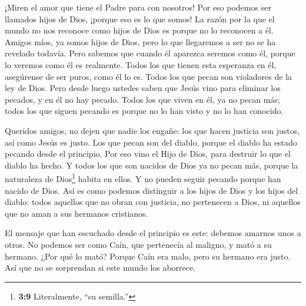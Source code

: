  ¡Miren el amor que tiene el Padre para con nosotros! Por
eso podemos ser llamados hijos de Dios, ¡porque eso es lo que somos! La
razón por la que el mundo no nos reconoce como hijos de Dios es porque
no lo reconocen a él.  Amigos míos, ya somos hijos de Dios,
pero lo que llegaremos a ser no se ha revelado todavía. Pero sabemos que
cuando él aparezca seremos como él, porque lo veremos como él es
realmente.  Todos los que tienen esta esperanza en él,
asegúrense de ser puros, como él lo es.  Todos los que pecan
son violadores de la ley de Dios.  Pero desde luego ustedes
saben que Jesús vino para eliminar los pecados, y en él no hay pecado.
 Todos los que viven en él, ya no pecan más; todos los que
siguen pecando es porque no lo han visto y no lo han conocido.

 Queridos amigos, no dejen que nadie los engañe: los que
hacen justicia son justos, así como Jesús es justo.  Los que
pecan son del diablo, porque el diablo ha estado pecando desde el
principio. Por eso vino el Hijo de Dios, para destruir lo que el diablo
ha hecho.  Y todos los que son nacidos de Dios ya no pecan
más, porque la naturaleza de Dios\footnote{\textbf{3:9} Literalmente,
  ``su semilla.''} habita en ellos. Y no pueden seguir pecando porque
han nacido de Dios.  Así es como podemos distinguir a los
hijos de Dios y los hijos del diablo: todos aquellos que no obran con
justicia, no pertenecen a Dios, ni aquellos que no aman a sus hermanos
cristianos.

 El mensaje que han escuchado desde el principio es este:
debemos amarnos unos a otros.  No podemos ser como Caín,
que pertenecía al maligno, y mató a su hermano. ¿Por qué lo mató? Porque
Caín era malo, pero su hermano era justo.  Así que no se
sorprendan si este mundo los aborrece.

